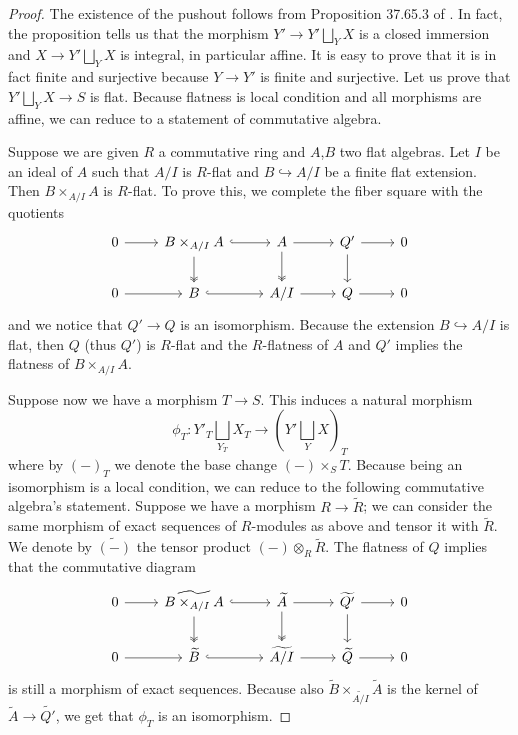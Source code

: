 \documentclass{alggeom}
\numberwithin{equation}{section}
\numberwithin{subsection}{section}
\theoremstyle{definition}
\theoremstyle{remark}
\begin{document}
\begin{proof}
	The existence of the pushout follows from Proposition 37.65.3 of \cite{StProj}. In fact, the proposition tells us that the morphism $Y'\rightarrow Y'\bigsqcup_Y X$ is a closed immersion and $X \rightarrow Y'\bigsqcup_Y X$ is integral, in particular affine. It is easy to prove that it is in fact finite and surjective because $Y\rightarrow Y'$ is finite and surjective.  Let us prove that $Y'\bigsqcup_Y X \rightarrow S$ is flat. Because flatness is local condition and all morphisms are affine, we can reduce to a statement of commutative algebra.
	
	Suppose we are given $R$ a commutative ring and $A$,$B$ two flat algebras. Let $I$ be an ideal of $A$ such that $A/I$ is $R$-flat and $B\hookrightarrow A/I$ be a finite flat extension. Then $B\times_{A/I}A$ is $R$-flat. To prove this, we complete the fiber square with the quotients 
	$$
	\begin{tikzcd}
		0 \arrow[r] & B\times_{A/I}A \arrow[d, two heads] \arrow[r, hook] & A \arrow[d, two heads] \arrow[r] & Q' \arrow[d] \arrow[r] & 0 \\
		0 \arrow[r] & B \arrow[r, hook]                                   & A/I \arrow[r]                    & Q \arrow[r]                                 & 0
	\end{tikzcd}
	$$
	and we notice that $Q'\rightarrow Q$ is an isomorphism. Because the extension $B\hookrightarrow A/I$ is flat, then $Q$ (thus $Q'$) is $R$-flat and the $R$-flatness of $A$ and $Q'$ implies the flatness of $B\times_{A/I}A$.  
	
	Suppose now we have a morphism $T\rightarrow S$. This induces a natural morphism 
	$$\phi_T:Y'_T \bigsqcup_{Y_T} X_T \rightarrow (Y'\bigsqcup_Y X)_T$$ where by $(-)_T$ we denote the base change $(-)\times_S T$. Because being an isomorphism is a local condition, we can reduce to the following commutative algebra's statement. Suppose we have a morphism $R\rightarrow \widetilde{R}$; we can consider the same morphism of exact sequences of $R$-modules as above and tensor it with $\widetilde{R}$. We denote by $\widetilde{(-)}$ the tensor product $(-)\otimes_R \widetilde{R}$. The flatness of $Q$ implies that the commutative diagram
	$$
	\begin{tikzcd}
		0 \arrow[r] & \widetilde{B\times_{A/I}A} \arrow[d, two heads] \arrow[r, hook] & \widetilde{A} \arrow[d, two heads] \arrow[r] & \widetilde{Q'}\arrow[d] \arrow[r] & 0 \\
		0 \arrow[r] & \widetilde{B} \arrow[r, hook]                                     & \widetilde{A/I} \arrow[r]                    & \widetilde{Q} \arrow[r]            & 0
	\end{tikzcd}
	$$
	is still a morphism of exact sequences. Because also $\widetilde{B} \times_{\widetilde{A/I}}  \widetilde{A}$ is the kernel of $\widetilde{A} \rightarrow \widetilde{Q'}$, we get that $\phi_T$ is an isomorphism. 
	

\end{proof}
\end{document}
